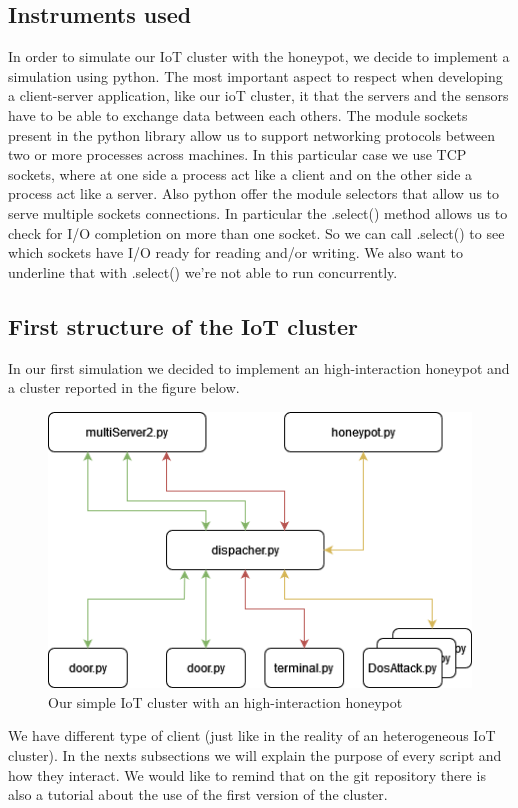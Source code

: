 \subsection{Instruments used}
In order to simulate our IoT cluster with the honeypot, we decide to implement a simulation using python. The most important aspect 
to respect when developing a client-server application, like our ioT cluster, it that the servers and the sensors have to be able to exchange data 
between each others. The module sockets present in  the python library allow us to support networking protocols between two or more processes across machines. In this particular case we use TCP sockets, where at one side a process act like a client and on the other side a process act like a server. Also python offer the module selectors that allow us to serve multiple sockets connections. In particular the .select() method allows us to check for I/O completion on more than one socket. So we can call .select() to see which sockets have I/O ready for reading and/or writing.  We also want to underline that with .select()  we’re not able to run concurrently. 
\subsection{ First structure of the IoT cluster}
In our first simulation we decided to implement an high-interaction honeypot and a cluster reported in the figure below.
\begin{figure}[h!]
  \centering
  \includegraphics[width = 12cm]{images/HighInterationHoneypot.drawio.png}
  \caption{Our simple IoT cluster with an high-interaction honeypot}
  \label{fig:DosImpl1}
\end{figure}
\FloatBarrier
\noindent
We have different type of client (just like in the reality of an heterogeneous IoT cluster).
In the nexts subsections we will explain the purpose of every script and how they interact. We would like to remind that on the git repository there is also a tutorial about the use of the first version of the cluster.
